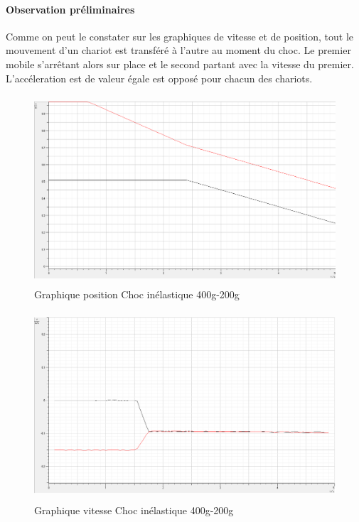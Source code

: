 \paragraph{Observation préliminaires}

Comme on peut le constater sur les graphiques de vitesse et de position, tout le mouvement d'un chariot est transféré à l'autre au moment du choc. Le premier mobile s'arrêtant alors sur place et le second partant avec la vitesse du premier. L'accéleration est de valeur égale est opposé pour chacun des chariots.

\newpage

\begin{figure}[h]
    \caption[Graphique position Choc inélastique 400g-200g]{Graphique position Choc inélastique 400g-200g}
    \centering
    \includegraphics[height=19em]{Data/400-200inela01.png}
\end{figure}

\begin{figure}[h]
    \caption[Graphique vitesse Choc inélastique 400g-200g]{Graphique vitesse Choc inélastique 400g-200g}
    \centering
    \includegraphics[height=19em]{Data/400-200inela02v.png}
\end{figure}

